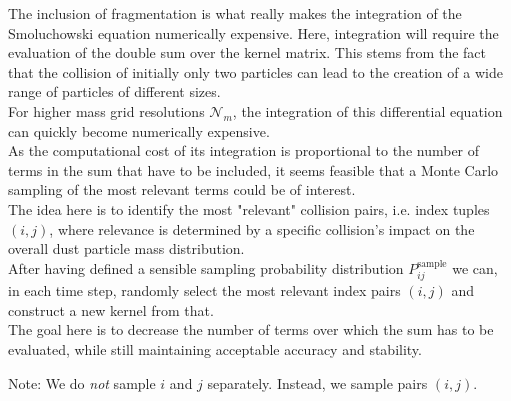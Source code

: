    The inclusion of fragmentation is what really makes the integration of the Smoluchowski
    equation numerically expensive. Here, integration will require the evaluation of the 
    double sum over the kernel matrix. This stems from the fact that the collision of initially 
    only two particles can lead to the creation of a wide range of particles of different sizes. \\
    
    For higher mass grid resolutions $\mathcal N_m$, the integration of this differential equation 
    can quickly become numerically expensive. \\

    As the computational cost of its integration is proportional to the number of terms 
    in the sum that have to be included, it seems feasible that a Monte Carlo sampling of 
    the most relevant terms could be of interest. \\

    The idea here is to identify the most "relevant" collision pairs, i.e. index tuples $(i, j)$,
    where relevance is determined by a specific collision's impact on the overall dust particle 
    mass distribution. \\

    After having defined a sensible sampling probability distribution $P_{ij}^\text{sample}$
    we can, in each time step, randomly select the most relevant index pairs $(i, j)$ and 
    construct a new kernel from that. \\

    The goal here is to decrease the number of terms over which the sum has to be evaluated,
    while still maintaining acceptable accuracy and stability.

    Note: We do \textit{not} sample $i$ and $j$ separately. Instead, we sample pairs $(i, j)$.


    \clearpage



     \\

     \\

